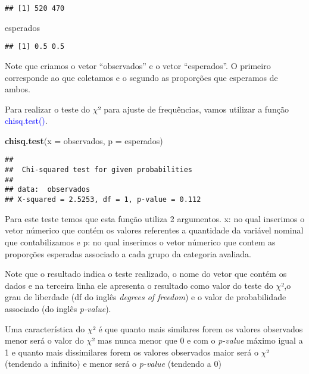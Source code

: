 \documentclass[14pt,titlepage, oneside, openany, a4paper]{book}
\newenvironment{Shaded}{\begin{snugshade}}{\end{snugshade}}
\newcommand{\DataTypeTok}[1]{\textcolor[rgb]{0.13,0.29,0.53}{#1}}
\newcommand{\KeywordTok}[1]{\textcolor[rgb]{0.13,0.29,0.53}{\textbf{#1}}}
\newcommand{\NormalTok}[1]{#1}
\begin{document}
\begin{verbatim}
## [1] 520 470
\end{verbatim}

\begin{Shaded}
\begin{Highlighting}[]
\NormalTok{esperados}
\end{Highlighting}
\end{Shaded}

\begin{verbatim}
## [1] 0.5 0.5
\end{verbatim}

Note que criamos o vetor ``observados'' e o vetor ``esperados''. O primeiro corresponde ao que coletamos e o segundo as proporções que esperamos de ambos.

Para realizar o teste do \(\chi\)² para ajuste de frequências, vamos utilizar a função \textcolor{blue}{chisq.test()}.

\begin{Shaded}
\begin{Highlighting}[]
\KeywordTok{chisq.test}\NormalTok{(}\DataTypeTok{x =}\NormalTok{ observados, }\DataTypeTok{p =}\NormalTok{ esperados)}
\end{Highlighting}
\end{Shaded}

\begin{verbatim}
## 
##  Chi-squared test for given probabilities
## 
## data:  observados
## X-squared = 2.5253, df = 1, p-value = 0.112
\end{verbatim}

Para este teste temos que esta função utiliza 2 argumentos. x: no qual inserimos o vetor númerico que contém os valores referentes a quantidade da variável nominal que contabilizamos e p: no qual inserimos o vetor númerico que contem as proporções esperadas associado a cada grupo da categoria avaliada.

Note que o resultado indica o teste realizado, o nome do vetor que contém os dados e na terceira linha ele apresenta o resultado como valor do teste do \(\chi\)²,o grau de liberdade (df do inglês \emph{degrees of freedom}) e o valor de probabilidade associado (do inglês \emph{p-value}).

Uma característica do \(\chi\)² é que quanto mais similares forem os valores observados menor será o valor do \(\chi\)² mas nunca menor que 0 e com o \emph{p-value} máximo igual a 1 e quanto mais dissimilares forem os valores observados maior será o \(\chi\)² (tendendo a infinito) e menor será o \emph{p-value} (tendendo a 0)
\end{document}
